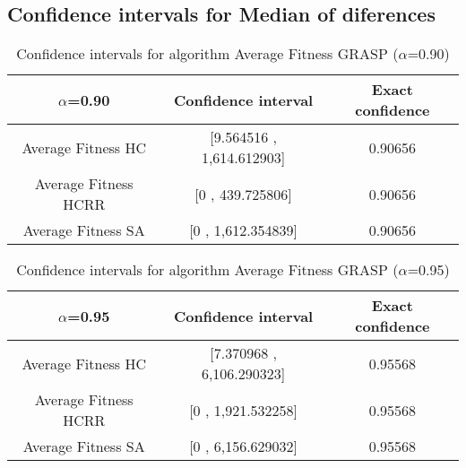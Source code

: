 \documentclass[a4paper,10pt]{article}
\begin{document}
\subsection{Confidence intervals for Median of diferences}

\begin{table}[!htp]
\centering\small
\begin{tabular}{
|c|c|c|}
\hline
 $\alpha$=0.90 & Confidence interval & Exact confidence \\ \hline 
Average Fitness HC       & [9.564516 , 1,614.612903] & 0.90656\\ \hline 
Average Fitness HCRR    & [0 , 439.725806] & 0.90656\\ \hline 
Average Fitness SA      & [0 , 1,612.354839] & 0.90656\\ \hline 

\end{tabular}
\caption{Confidence intervals for algorithm Average Fitness GRASP ($\alpha$=0.90)}
\end{table}
\begin{table}[!htp]
\centering\small
\begin{tabular}{
|c|c|c|}
\hline
 $\alpha$=0.95 & Confidence interval & Exact confidence \\ \hline 
Average Fitness HC       & [7.370968 , 6,106.290323] & 0.95568\\ \hline 
Average Fitness HCRR    & [0 , 1,921.532258] & 0.95568\\ \hline 
Average Fitness SA      & [0 , 6,156.629032] & 0.95568\\ \hline 

\end{tabular}
\caption{Confidence intervals for algorithm Average Fitness GRASP ($\alpha$=0.95)}
\end{table}

 \clearpage 
\end{document}
